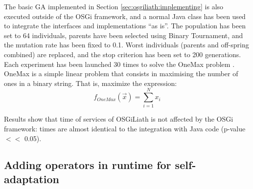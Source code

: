  The basic GA implemented in Section \ref{sec:osgiliath:implementing} is also executed outside of
 the OSGi framework, and a normal Java class has been used to
 integrate the interfaces and implementations ``as is''. The
 population has been set to 64 individuals, parents have been selected
 using Binary Tournament, and the mutation rate has been fixed to
 0.1. %
Worst individuals (parents and off-spring combined) are replaced, and
the stop criterion has been set to 200 generations. Each experiment
has been launched 30 times to solve the OneMax problem
\cite{SchafferOnemax91}. OneMax is a simple linear problem 
that consists in maximising the number of ones in a binary string. That is, maximize the expression:
\begin{equation}
f_{OneMax}(\vec{x}) = \sum_{i=1}^{N}{x_{i}}
\end{equation}

Results show that time of services of OSGiLiath is not affected by the
OSGi framework: times are almost identical to the integration with
Java code (p-value $<<$ 0.05).

\subsection{Adding operators in runtime for self-adaptation} %

